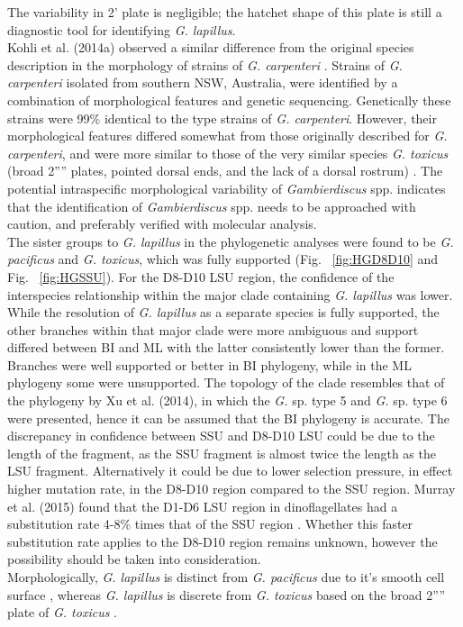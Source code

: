 \documentclass[12pt]{article}
\begin{document}
The variability in 2' plate is negligible; the hatchet shape of this plate is still a diagnostic tool for identifying \textit{G. lapillus}.\\
Kohli et al. (2014a) observed a similar difference from the original species description in the morphology of strains of  \emph{G. carpenteri} \citep{kohli2014high}. 
Strains of \emph{G. carpenteri} isolated from southern NSW, Australia, were identified by a combination of morphological features and genetic sequencing. 
Genetically these strains were 99\% identical to the type strains of \textit{G. carpenteri}. 
However, their morphological features differed somewhat from those originally described for \textit{G. carpenteri}, and were more similar to those of the very similar species \emph{G. toxicus} (broad 2'''' plates, pointed dorsal ends, and the lack of a dorsal rostrum) \citep{kohli2014high,litaker2009taxonomy}.
The potential intraspecific morphological variability of \emph{Gambierdiscus} spp. indicates that the identification of \emph{Gambierdiscus} spp. needs to be approached with caution, and preferably verified with molecular analysis.\\
The sister groups to \emph{G. lapillus} in the phylogenetic analyses were found to be \emph{G. pacificus} and \emph{G. toxicus}, 
which was fully supported (Fig. ~\ref{fig:HGD8D10} and Fig. ~\ref{fig:HGSSU}). 
For the D8-D10 LSU region, the confidence of the interspecies relationship within the major clade containing \emph{G. lapillus} was lower.  
While the resolution of \emph{G. lapillus} as a separate species is fully supported, the other branches within that major clade were more ambiguous and support differed between BI and ML with the latter consistently lower than the former. 
Branches were well supported or better in BI phylogeny, while in the ML phylogeny some were unsupported. 
The topology of the clade resembles that of the phylogeny by Xu et al. (2014), in which the \emph{G.} sp. type 5 and \emph{G.} sp. type 6 were presented, hence it can be assumed that the BI phylogeny is accurate\citep{xu2014distribution}.
The discrepancy in confidence between SSU and D8-D10 LSU could be due to the length of the fragment, as the SSU fragment is almost twice the length as the LSU fragment. 
Alternatively it could be due to lower selection pressure, in effect higher mutation rate, in the D8-D10 region compared to the SSU region. 
Murray et al. (2015) found that the D1-D6 LSU region in dinoflagellates had a substitution rate 4-8\% times that of the SSU region \citep{murray2005improving}. 
Whether this faster substitution rate applies to the D8-D10 region remains unknown, however the possibility should be taken into consideration. \\
Morphologically, \emph{G. lapillus} is distinct from \emph{G. pacificus} due to it's smooth cell surface \citep{chinain1999morphology}, whereas \emph{G. lapillus} is discrete from \emph{G. toxicus} based on the broad 2'''' plate of \emph{G. toxicus} \citep{litaker2009taxonomy}.\\
\end{document}

